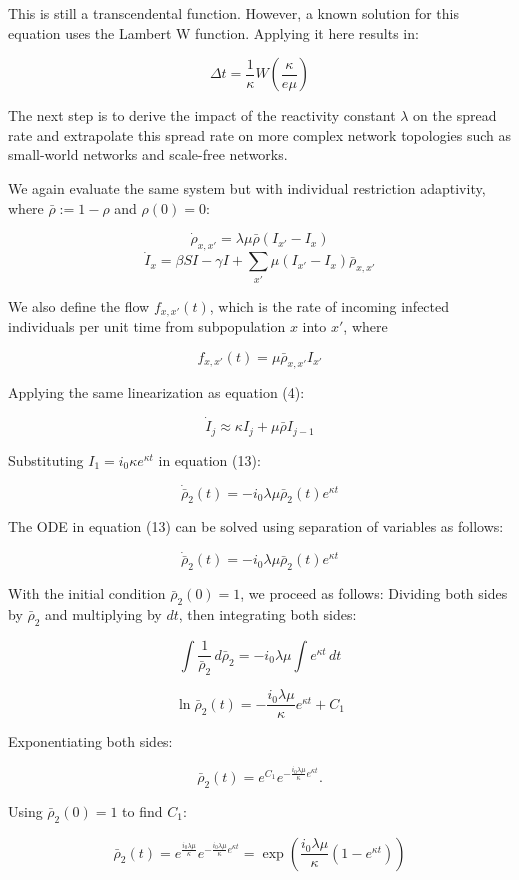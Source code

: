 \documentclass{article}
\begin{document}
This is still a transcendental function. However, a known solution for this equation uses the Lambert W function. Applying it here results in:

$$
\Delta t = \frac{1}{\kappa} W\left(\frac{\kappa}{e \mu}\right)
$$

The next step is to derive the impact of the reactivity constant $\lambda$ on the spread rate and extrapolate this spread rate on more complex network topologies such as small-world networks and scale-free networks.

We again evaluate the same system but with individual restriction adaptivity, where $\bar \rho := 1 - \rho$ and $\rho(0) = 0$:

$$
\dot \rho_{x,x'} = \lambda \mu \bar \rho (I_{x'} - I_x)
$$
$$
\dot I_x = \beta S I - \gamma I +  \sum_{x'} \mu (I_{x'} - I_x) \bar \rho_{x,x'}
$$

We also define the flow $f_{x,x'}(t)$, which is the rate of incoming infected individuals per unit time from subpopulation $x$ into $x'$, where 

$$
f_{x,x'}(t) = \mu \bar \rho_{x,x'} I_{x'}
$$

Applying the same linearization as equation (4):

$$
\dot I_j \approx \kappa I_j + \mu \bar \rho I_{j-1} 
$$

Substituting $I_1 = i_0 \kappa e^{\kappa t}$ in equation (13):

$$
\dot{\bar{\rho}}_2(t) = - i_{0} \lambda \mu \bar \rho_{2}(t) e^{\kappa t}
$$

The ODE in equation (13) can be solved using separation of variables as follows:

$$
\dot{\bar{\rho}}_2(t) = - i_{0} \lambda \mu \bar \rho_{2}(t) e^{\kappa t}
$$

With the initial condition $\bar \rho_{2}(0) = 1$, we proceed as follows:
Dividing both sides by $\bar \rho_{2}$ and multiplying by $dt$, then integrating both sides:

$$
\int \frac{1}{\bar \rho_{2}} \, d\bar \rho_{2} = - i_{0} \lambda \mu \int e^{\kappa t} \, dt
$$

$$
\ln \bar \rho_{2}(t) = - \frac{i_{0} \lambda \mu}{\kappa} e^{\kappa t} + C_1
$$

Exponentiating both sides:

$$
\bar \rho_{2}(t) = e^{C_1} e^{-\frac{i_{0} \lambda \mu}{\kappa} e^{\kappa t}}.
$$ 

Using $\bar \rho_{2}(0) = 1$ to find $C_1$:

$$
\bar \rho_{2}(t) = e^{\frac{i_{0} \lambda \mu}{\kappa}} e^{-\frac{i_{0} \lambda \mu}{\kappa} e^{\kappa t}}
 = \exp\left(\frac{i_{0} \lambda \mu}{\kappa} \left( 1 - e^{\kappa t} \right)\right) 
$$
\end{document}
